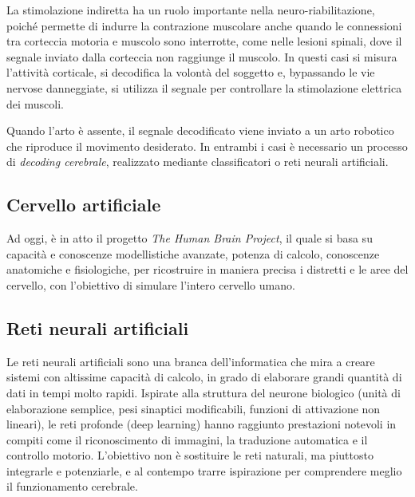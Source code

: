 La stimolazione indiretta ha un ruolo importante nella neuro-riabilitazione, poiché permette di indurre la contrazione muscolare anche quando le connessioni tra corteccia motoria e muscolo sono interrotte, come nelle lesioni spinali, dove il segnale inviato dalla corteccia non raggiunge il muscolo. In questi casi si misura l’attività corticale, si decodifica la volontà del soggetto e, bypassando le vie nervose danneggiate, si utilizza il segnale per controllare la stimolazione elettrica dei muscoli.

Quando l’arto è assente, il segnale decodificato viene inviato a un arto robotico che riproduce il movimento desiderato. In entrambi i casi è necessario un processo di \textit{decoding cerebrale}, realizzato mediante classificatori o reti neurali artificiali.

\subsection{Cervello artificiale}
Ad oggi, è in atto il progetto \textit{The Human Brain Project}, il quale si basa su capacità e conoscenze modellistiche avanzate, potenza di calcolo, conoscenze anatomiche e fisiologiche, per ricostruire in maniera precisa i distretti e le aree del cervello, con l’obiettivo di simulare l’intero cervello umano.

\subsection{Reti neurali artificiali}
Le reti neurali artificiali sono una branca dell’informatica che mira a creare sistemi con altissime capacità di calcolo, in grado di elaborare grandi quantità di dati in tempi molto rapidi. Ispirate alla struttura del neurone biologico (unità di elaborazione semplice, pesi sinaptici modificabili, funzioni di attivazione non lineari), le reti profonde (deep learning) hanno raggiunto prestazioni notevoli in compiti come il riconoscimento di immagini, la traduzione automatica e il controllo motorio. L’obiettivo non è sostituire le reti naturali, ma piuttosto integrarle e potenziarle, e al contempo trarre ispirazione per comprendere meglio il funzionamento cerebrale.


